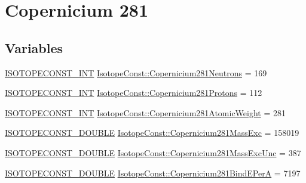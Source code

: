 \hypertarget{group___isotope_const-_copernicium-_cn281}{}\section{Copernicium 281}
\label{group___isotope_const-_copernicium-_cn281}
\subsection*{Variables}
\begin{DoxyCompactItemize}
\item 
\mbox{\hyperlink{group___isotope_const-_macros_ga5f18360b3e99483a35c32d789e62621c}{I\+S\+O\+T\+O\+P\+E\+C\+O\+N\+S\+T\+\_\+\+I\+NT}} \mbox{\hyperlink{group___isotope_const-_copernicium-_cn281_gac5c5f5c7b6e9c6b1fade309c47250498}{Isotope\+Const\+::\+Copernicium281\+Neutrons}} = 169
\item 
\mbox{\hyperlink{group___isotope_const-_macros_ga5f18360b3e99483a35c32d789e62621c}{I\+S\+O\+T\+O\+P\+E\+C\+O\+N\+S\+T\+\_\+\+I\+NT}} \mbox{\hyperlink{group___isotope_const-_copernicium-_cn281_ga90d8644aa72e7f4d7e76f594b2fc911e}{Isotope\+Const\+::\+Copernicium281\+Protons}} = 112
\item 
\mbox{\hyperlink{group___isotope_const-_macros_ga5f18360b3e99483a35c32d789e62621c}{I\+S\+O\+T\+O\+P\+E\+C\+O\+N\+S\+T\+\_\+\+I\+NT}} \mbox{\hyperlink{group___isotope_const-_copernicium-_cn281_gac36a023c2ebe66de2dd86026393e089f}{Isotope\+Const\+::\+Copernicium281\+Atomic\+Weight}} = 281
\item 
\mbox{\hyperlink{group___isotope_const-_macros_ga8f45a7272ce02c0b4c65c44636ed719a}{I\+S\+O\+T\+O\+P\+E\+C\+O\+N\+S\+T\+\_\+\+D\+O\+U\+B\+LE}} \mbox{\hyperlink{group___isotope_const-_copernicium-_cn281_ga6c116d4b14f4bb3bb8d9a4394120bd95}{Isotope\+Const\+::\+Copernicium281\+Mass\+Exc}} = 158019
\item 
\mbox{\hyperlink{group___isotope_const-_macros_ga8f45a7272ce02c0b4c65c44636ed719a}{I\+S\+O\+T\+O\+P\+E\+C\+O\+N\+S\+T\+\_\+\+D\+O\+U\+B\+LE}} \mbox{\hyperlink{group___isotope_const-_copernicium-_cn281_gab76df2e7449f4015ea33e1d5ab23f7c6}{Isotope\+Const\+::\+Copernicium281\+Mass\+Exc\+Unc}} = 387
\item 
\mbox{\hyperlink{group___isotope_const-_macros_ga8f45a7272ce02c0b4c65c44636ed719a}{I\+S\+O\+T\+O\+P\+E\+C\+O\+N\+S\+T\+\_\+\+D\+O\+U\+B\+LE}} \mbox{\hyperlink{group___isotope_const-_copernicium-_cn281_ga5082f4cb269d1d156afe6e45df5e719f}{Isotope\+Const\+::\+Copernicium281\+Bind\+E\+PerA}} = 7197

\end{DoxyCompactItemize}
